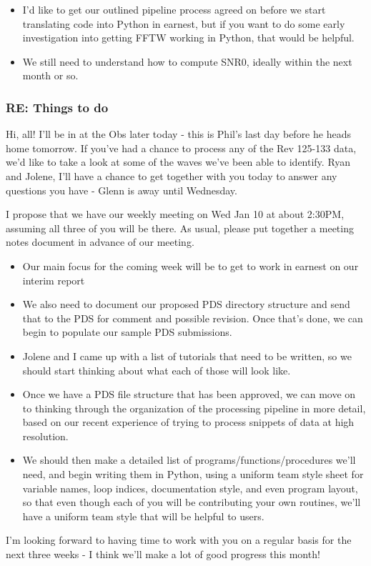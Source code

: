 \documentclass[crop=false,class=book]{standalone}
\begin{document}
\begin{itemize}
    \item I'd like to get our outlined pipeline process agreed on before we start translating code into Python in earnest, but if you want to do some early investigation into getting FFTW working in Python, that would be helpful.
    \item We still need to understand how to compute SNR0, ideally within the next month or so.
\end{itemize}
\subsubsection{\footnotesize RE: Things to do}
Hi, all! I'll be in at the Obs later today - this is Phil's last day before he heads home tomorrow. If you've had a chance to process any of the Rev 125-133 data, we'd like to take a look at some of the waves we've been able to identify. Ryan and Jolene, I'll have a chance to get together with you today to answer any questions you have - Glenn is away until Wednesday.\par
I propose that we have our weekly meeting on Wed Jan 10 at about 2:30PM, assuming all three of you will be there. As usual, please put together a meeting notes document in advance of our meeting.
\begin{itemize}
    \item Our main focus for the coming week will be to get to work in earnest on our interim report
    \item We also need to document our proposed PDS directory structure and send that to the PDS for comment and possible revision. Once that's done, we can begin to populate our sample PDS submissions. 
    \item Jolene and I came up with a list of tutorials that need to be written, so we should start thinking about what each of those will look like.
    \item Once we have a PDS file structure that has been approved, we can move on to thinking through the organization of the processing pipeline in more detail, based on our recent experience of trying to process snippets of data at high resolution.
    \item We should then make a detailed list of programs/functions/procedures we'll need, and begin writing them in Python, using a uniform team style sheet for variable names, loop indices, documentation style, and even program layout, so that even though each of you will be contributing your own routines, we'll have a uniform team style that will be helpful to users.
\end{itemize}
I'm looking forward to having time to work with you on a regular basis for the next three weeks - I think we'll make a lot of good progress this month!
\end{document}
